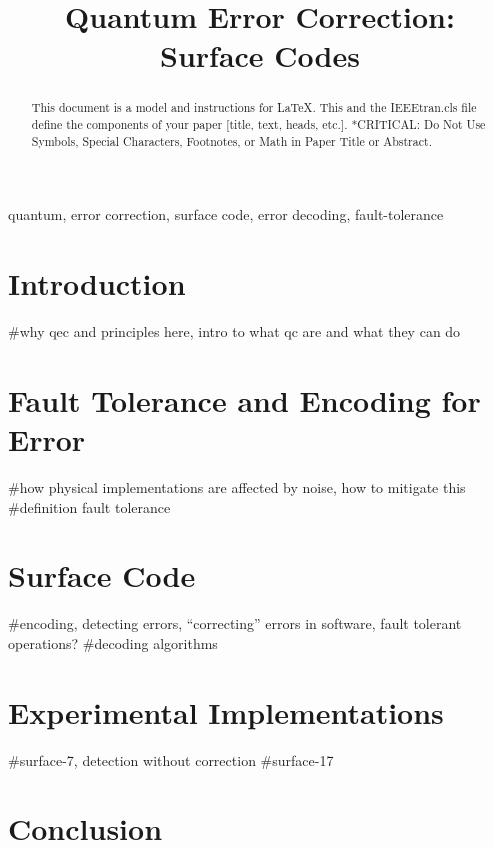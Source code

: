 \documentclass[conference]{IEEEtran}
\begin{document}
\title{Quantum Error Correction: Surface Codes}

\author{

  \and

}

\maketitle


\begin{abstract}
  This document is a model and instructions for \LaTeX. This and the
  IEEEtran.cls file define the components of your paper [title, text, heads,
  etc.]. *CRITICAL: Do Not Use Symbols, Special Characters, Footnotes, or Math
  in Paper Title or Abstract.
\end{abstract}

\begin{IEEEkeywords}
  quantum, error correction, surface code, error decoding, fault-tolerance
\end{IEEEkeywords}

\section{Introduction}
#why qec and principles here, intro to what qc are and what they can do


\section{Fault Tolerance and Encoding for Error}
#how physical implementations are affected by noise, how to mitigate this
#definition fault tolerance


\section{Surface Code}
#encoding, detecting errors, ``correcting'' errors in software, fault tolerant
operations?
#decoding algorithms


\section{Experimental Implementations}
#surface-7, detection without correction
#surface-17


\section{Conclusion}


\printbibliography
\end{document}
